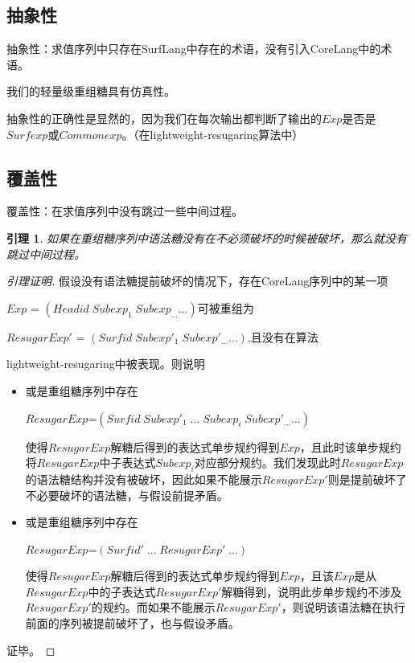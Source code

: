 



\subsection{抽象性}
抽象性：求值序列中只存在SurfLang中存在的术语，没有引入CoreLang中的术语。

\begin{mythm}[仿真性]
	我们的轻量级重组糖具有仿真性。
\end{mythm}

抽象性的正确性是显然的，因为我们在每次输出都判断了输出的$Exp$是否是$Surfexp$或$Commonexp$。（在lightweight-resugaring算法中）

\subsection{覆盖性}
覆盖性：在求值序列中没有跳过一些中间过程。

\newtheorem{lemma}{引理}[section]

\begin{lemma}
	如果在重组糖序列中语法糖没有在不必须破坏的时候被破坏，那么就没有跳过中间过程。
\end{lemma}

\begin{proof}[引理证明]
	假设没有语法糖提前破坏的情况下，存在CoreLang序列中的某一项
	
	$Exp$ = $(Headid\;Subexp_{1}\;Subexp_{\ldots} \ldots)$可被重组为
	
	$ResugarExp'$ = $(Surfid\;Subexp'_{1}\;Subexp'_{\ldots}\ldots)$,且没有在算法
	\begin{flushleft}
		lightweight-resugaring中被表现。则说明
	\end{flushleft}
	\begin{itemize}
		\item 或是重组糖序列中存在
		
		$ResugarExp$=$(Surfid\;Subexp'_{1}\;\ldots\;Subexp_{i}\;Subexp'_{\ldots}\ldots)$
		
		使得$ResugarExp$解糖后得到的表达式单步规约得到$Exp$，且此时该单步规约将$ResugarExp$中子表达式$Subexp_{i}$对应部分规约。我们发现此时$ResugarExp$的语法糖结构并没有被破坏，因此如果不能展示$ResugarExp'$则是提前破坏了不必要破坏的语法糖，与假设前提矛盾。
		
		\item 或是重组糖序列中存在
		
		$ResugarExp$=$(Surfid'\;\ldots\;ResugarExp'\;\ldots)$
		
		使得$ResugarExp$解糖后得到的表达式单步规约得到$Exp$，且该$Exp$是从$ResugarExp$中的子表达式$ResugarExp'$解糖得到，说明此步单步规约不涉及$ResugarExp'$的规约。而如果不能展示$ResugarExp'$，则说明该语法糖在执行前面的序列被提前破坏了，也与假设矛盾。

	\end{itemize}

证毕。
\end{proof}

